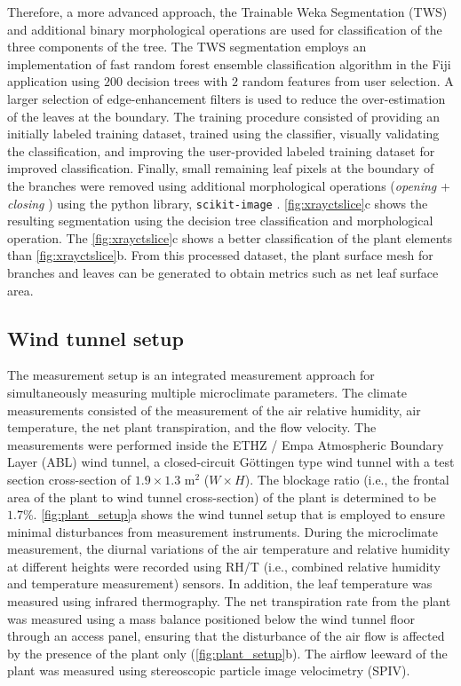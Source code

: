 Therefore, a more advanced approach, the Trainable Weka Segmentation (TWS) \citep{Arganda-Carreras2017} and additional binary morphological operations are used for classification of the three components of the tree. The TWS segmentation employs an implementation of fast random forest ensemble classification algorithm in the Fiji application \citep{Schindelin2012a} using $200$ decision trees with $2$ random features from user selection. A larger selection of edge-enhancement filters is used to reduce the over-estimation of the leaves at the boundary. The training procedure consisted of providing an initially labeled training dataset, trained using the classifier, visually validating the classification, and improving the user-provided labeled training dataset for improved classification. Finally, small remaining leaf pixels at the boundary of the branches were removed using additional morphological operations (\textit{opening} + \textit{closing} \citep{Haralick1987}) using the python library, \texttt{scikit-image} \citep{VanderWalt2014a}. \cref{fig:xrayctslice}c shows the resulting segmentation using the decision tree classification and morphological operation. The \cref{fig:xrayctslice}c shows a better classification of the plant elements than \cref{fig:xrayctslice}b. From this processed dataset, the plant surface mesh for branches and leaves can be generated to obtain metrics such as net leaf surface area.


\subsection{Wind tunnel setup}
\label{subsec:windtunnelsetup}

The measurement setup is an integrated measurement approach for simultaneously measuring multiple microclimate parameters. The climate measurements consisted of the measurement of the air relative humidity, air temperature, the net plant transpiration, and the flow velocity. The measurements were performed inside the ETHZ / Empa Atmospheric Boundary Layer (ABL) wind tunnel, a closed-circuit G\"ottingen type wind tunnel with a test section cross-section of $1.9\times1.3$ m$^2$ ($W\times H$). The blockage ratio (i.e., the frontal area of the plant to wind tunnel cross-section) of the plant is determined to be $1.7$\%. \cref{fig:plant_setup}a shows the wind tunnel setup that is employed to ensure minimal disturbances from measurement instruments. During the microclimate measurement, the diurnal variations of the air temperature and relative humidity at different heights were recorded using RH/T (i.e., combined relative humidity and temperature measurement) sensors. In addition, the leaf temperature was measured using infrared thermography. The net transpiration rate from the plant was measured using a mass balance positioned below the wind tunnel floor through an access panel, ensuring that the disturbance of the air flow is affected by the presence of the plant only (\cref{fig:plant_setup}b). The airflow leeward of the plant was measured using stereoscopic particle image velocimetry (SPIV). 

